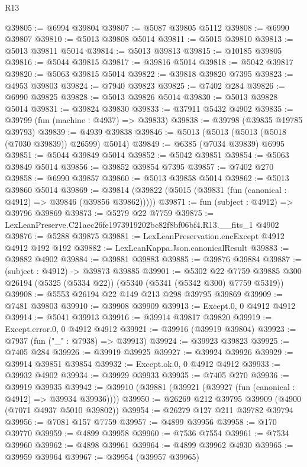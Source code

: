 \begin{lexlean}{R13}
\begin{coremodule}
@39805 := @6994 @39804
@39807 := @5087 @39805 @5112
@39808 := @6990 @39807
@39810 := @5013 @39808 @5014
@39811 := @5015 @39810
@39813 := @5013 @39811 @5014
@39814 := @5013 @39813
@39815 := @10185 @39805
@39816 := @5044 @39815
@39817 := @39816 @5014
@39818 := @5042 @39817
@39820 := @5063 @39815 @5014
@39822 := @39818 @39820 @7395
@39823 := @4953 @39803
@39824 := @7940 @39823
@39825 := @7402 @284
@39826 := @6990 @39825
@39828 := @5013 @39826 @5014
@39830 := @5013 @39828 @5014
@39831 := @39824 @39830
@39833 := @37911 @5432 @4902
@39835 := @39799 (fun (machine : @4937) => @39833)
@39838 := @39798 (@39835 @19785 @39793)
@39839 := @4939 @39838
@39846 := @5013 (@5013 (@5013 (@5018 (@7030 @39839)) @26599) @5014)
@39849 := @6385 (@7034 @39839) @6995
@39851 := @5044 @39849 @5014
@39852 := @5042 @39851
@39854 := @5063 @39849 @5014
@39856 := @39852 @39854 @7395
@39857 := @7402 @270
@39858 := @6990 @39857
@39860 := @5013 @39858 @5014
@39862 := @5013 @39860 @5014
@39869 := @39814 (@39822 (@5015 (@39831 (fun (canonical : @4912) => @39846 (@39856 @39862)))))
@39871 := fun (subject : @4912) => @39796 @39869
@39873 := @5279 @22 @7759
@39875 := LexLeanPreserve.C21aec26fe1973919202bc82f8bf06bf4.R13.__fits_1 @4902
@39876 := @5288 @39875
@39881 := LexLeanPreservation.encExcept @4912 @4912 @192 @192
@39882 := LexLeanKappa.Json.canonicalResult
@39883 := @39882 @4902
@39884 := @39881 @39883
@39885 := @39876 @39884
@39887 := (subject : @4912) -> @39873 @39885
@39901 := @5302
    @22
    @7759
    @39885
    @300
    @26194
    (@5325 (@5334 @22))
    (@5340 (@5341 (@5342 @300) @7759 @5319))
@39908 := @5553 @26194 @22 @149 @213 @298 @39795 @39869
@39909 := @7481 @39803
@39910 := @39908 @39909
@39913 := Except.{0, 0} @4912 @4912
@39914 := @5041 @39913
@39916 := @39914 @39817 @39820
@39919 := Except.error.{0, 0} @4912 @4912
@39921 := @39916 (@39919 @39804)
@39923 := @7937 (fun ("_" : @7938) => @39913)
@39924 := @39923 @39823
@39925 := @7405 @284
@39926 := @39919 @39925
@39927 := @39924 @39926
@39929 := @39914 @39851 @39854
@39932 := Except.ok.{0, 0} @4912 @4912
@39933 := @39932 @4902
@39934 := @39929 @39933
@39935 := @7405 @270
@39936 := @39919 @39935
@39942 := @39910 (@39881 (@39921 (@39927 (fun (canonical : @4912) => @39934 @39936))))
@39950 := @26269 @212 @39795 @39909 (@4900 (@7071 @4937 @5010 @39802))
@39954 := @26279 @127 @211 @39782 @39794
@39956 := @7081 @157 @7759
@39957 := @4899 @39956
@39958 := @170 @39770
@39959 := @4899 @39958
@39960 := @7536 @7554
@39961 := @7534 @39960
@39962 := @4898 @39961
@39964 := @4899 @39962 @4930
@39965 := @39959 @39964
@39967 := @39954 (@39957 @39965)

\end{coremodule}
\end{lexlean}
